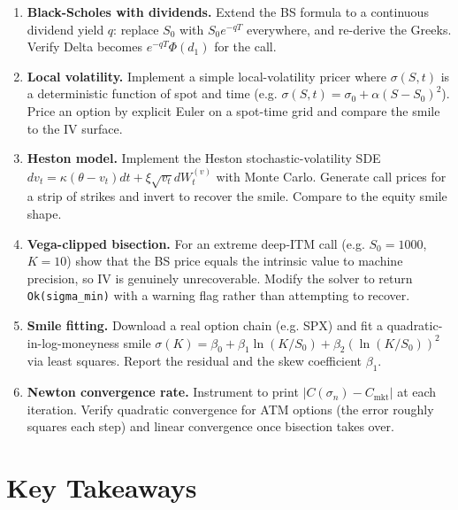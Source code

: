 \begin{enumerate}
    \item \textbf{Black-Scholes with dividends.} Extend the BS formula to
      a continuous dividend yield $q$: replace $S_0$ with $S_0 e^{-qT}$
      everywhere, and re-derive the Greeks. Verify Delta becomes
      $e^{-qT} \Phi(d_1)$ for the call.

    \item \textbf{Local volatility.} Implement a simple local-volatility
      pricer where $\sigma(S, t)$ is a deterministic function of spot and
      time (e.g. $\sigma(S, t) = \sigma_0 + \alpha (S - S_0)^2$). Price an
      option by explicit Euler on a spot-time grid and compare the smile
      to the IV surface.

    \item \textbf{Heston model.} Implement the Heston stochastic-volatility
      SDE $dv_t = \kappa(\theta - v_t) dt + \xi \sqrt{v_t} dW^{(v)}_t$
      with Monte Carlo. Generate call prices for a strip of strikes and
      invert to recover the smile. Compare to the equity smile shape.

    \item \textbf{Vega-clipped bisection.} For an extreme deep-ITM call
      (e.g. $S_0 = 1000$, $K = 10$) show that the BS price equals the
      intrinsic value to machine precision, so IV is genuinely
      unrecoverable. Modify the solver to return \texttt{Ok(sigma\_min)}
      with a warning flag rather than attempting to recover.

    \item \textbf{Smile fitting.} Download a real option chain (e.g.
      SPX) and fit a quadratic-in-log-moneyness smile
      $\sigma(K) = \beta_0 + \beta_1 \ln(K/S_0) + \beta_2 (\ln(K/S_0))^2$
      via least squares. Report the residual and the skew coefficient
      $\beta_1$.

    \item \textbf{Newton convergence rate.} Instrument 
      to print $|C(\sigma_n) - C_{\text{mkt}}|$ at each iteration. Verify
      quadratic convergence for ATM options (the error roughly squares
      each step) and linear convergence once bisection takes over.
\end{enumerate}

\section{Key Takeaways}

